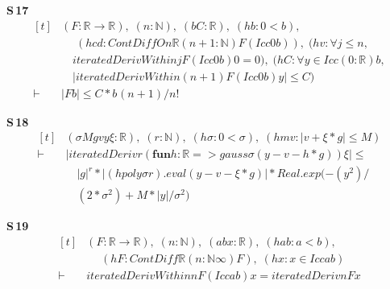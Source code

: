 \noindent\textbf{S\,17}\quad{}
{\footnotesize\[ \begin{aligned}[t]
&(\mathit{F} : \mathbb{R} \to \mathbb{R} ),\; (\mathit{n} : \mathbb{N} ),\; (\mathit{b} \mathit{C} : \mathbb{R} ),\; (\mathit{hb} : 0 < \mathit{b}),\\
&\quad \; (\mathit{hcd} : \mathit{ContDiffOn} \mathbb{R} (\mathit{n} + 1 : \mathbb{N} ) \mathit{F} (\mathit{Icc} 0 \mathit{b})),\; (\mathit{hv} : \forall \mathit{j} \leq \mathit{n},\\
&\quad \mathit{iteratedDerivWithin} \mathit{j} \mathit{F} (\mathit{Icc} 0 \mathit{b}) 0 = 0),\; (\mathit{hC} : \forall \mathit{y} \in \mathit{Icc} (0:\mathbb{R} ) \mathit{b},\\
&\quad |\mathit{iteratedDerivWithin} (\mathit{n} + 1) \mathit{F} (\mathit{Icc} 0 \mathit{b}) \mathit{y}| \leq \mathit{C})\\
\vdash\;&|\mathit{F} \mathit{b}| \leq \mathit{C} * \mathit{b} ^{} (\mathit{n} + 1) / \mathit{n} !
\end{aligned} \]}

\noindent\textbf{S\,18}\quad{}
{\footnotesize\[ \begin{aligned}[t]
&(\sigma \mathit{M} \mathit{g} \mathit{v} \mathit{y} \xi : \mathbb{R} ),\; (\mathit{r} : \mathbb{N} ),\; (\mathit{hσ} : 0 < \sigma ),\; (\mathit{hmv} : |\mathit{v} + \xi * \mathit{g}| \leq \mathit{M})\\
\vdash\;&|\mathit{iteratedDeriv} \mathit{r} (\mathbf{fun} \mathit{h} : \mathbb{R} => \mathit{gauss} \sigma (\mathit{y} - \mathit{v} - \mathit{h} * \mathit{g})) \xi | \leq\\
&\quad |\mathit{g}| ^{\mathit{r}} * |(\mathit{hpoly} \sigma \mathit{r}).\mathit{eval} (\mathit{y} - \mathit{v} - \xi * \mathit{g})| * \mathit{Real}.\mathit{exp} (-(\mathit{y} ^{2}) /\\
&\quad (2 * \sigma ^{2}) + \mathit{M} * |\mathit{y}| / \sigma ^{2})
\end{aligned} \]}

\noindent\textbf{S\,19}\quad{}
{\footnotesize\[ \begin{aligned}[t]
&(\mathit{F} : \mathbb{R} \to \mathbb{R} ),\; (\mathit{n} : \mathbb{N} ),\; (\mathit{a} \mathit{b} \mathit{x} : \mathbb{R} ),\; (\mathit{hab} : \mathit{a} < \mathit{b}),\\
&\quad \; (\mathit{hF} : \mathit{ContDiff} \mathbb{R} (\mathit{n} : \mathbb{N} \infty ) \mathit{F}),\; (\mathit{hx} : \mathit{x} \in \mathit{Icc} \mathit{a} \mathit{b})\\
\vdash\;&\mathit{iteratedDerivWithin} \mathit{n} \mathit{F} (\mathit{Icc} \mathit{a} \mathit{b}) \mathit{x} = \mathit{iteratedDeriv} \mathit{n} \mathit{F} \mathit{x}
\end{aligned} \]}

